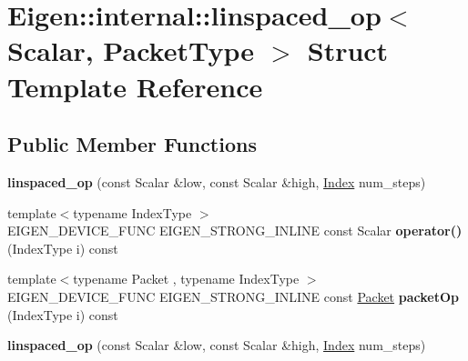 \hypertarget{struct_eigen_1_1internal_1_1linspaced__op}{}\section{Eigen\+:\+:internal\+:\+:linspaced\+\_\+op$<$ Scalar, Packet\+Type $>$ Struct Template Reference}
\label{struct_eigen_1_1internal_1_1linspaced__op}
\subsection*{Public Member Functions}
\begin{DoxyCompactItemize}
\item 
\mbox{\label{struct_eigen_1_1internal_1_1linspaced__op_a74e377ffab00441a688b1190dc930a65}} 
{\bfseries linspaced\+\_\+op} (const Scalar \&low, const Scalar \&high, \hyperlink{namespace_eigen_a62e77e0933482dafde8fe197d9a2cfde}{Index} num\+\_\+steps)
\item 
\mbox{\label{struct_eigen_1_1internal_1_1linspaced__op_ab86424ad4c009092eb466fa98483ff5b}} 
{\footnotesize template$<$typename Index\+Type $>$ }\\E\+I\+G\+E\+N\+\_\+\+D\+E\+V\+I\+C\+E\+\_\+\+F\+U\+NC E\+I\+G\+E\+N\+\_\+\+S\+T\+R\+O\+N\+G\+\_\+\+I\+N\+L\+I\+NE const Scalar {\bfseries operator()} (Index\+Type i) const
\item 
\mbox{\label{struct_eigen_1_1internal_1_1linspaced__op_a217a0431792ac4ff26701b596bca99ce}} 
{\footnotesize template$<$typename Packet , typename Index\+Type $>$ }\\E\+I\+G\+E\+N\+\_\+\+D\+E\+V\+I\+C\+E\+\_\+\+F\+U\+NC E\+I\+G\+E\+N\+\_\+\+S\+T\+R\+O\+N\+G\+\_\+\+I\+N\+L\+I\+NE const \hyperlink{union_eigen_1_1internal_1_1_packet}{Packet} {\bfseries packet\+Op} (Index\+Type i) const
\item 
\mbox{\label{struct_eigen_1_1internal_1_1linspaced__op_a74e377ffab00441a688b1190dc930a65}} 
{\bfseries linspaced\+\_\+op} (const Scalar \&low, const Scalar \&high, \hyperlink{namespace_eigen_a62e77e0933482dafde8fe197d9a2cfde}{Index} num\+\_\+steps)

\end{DoxyCompactItemize}
